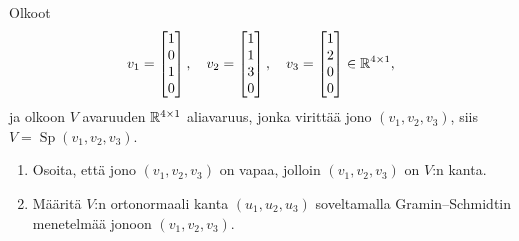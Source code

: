 \documentclass[11pt,a4paper]{amsart}
\begin{document}
\newpage

\begin{exercise}
  Olkoot
  \[
    v_1 =
    \begin{bmatrix}1 \\ 0 \\ 1 \\ 0
    \end{bmatrix},\quad
    v_2 =
    \begin{bmatrix}1 \\ 1 \\ 3 \\ 0
    \end{bmatrix},\quad
    v_3 =
    \begin{bmatrix}1 \\ 2 \\ 0 \\ 0
    \end{bmatrix}
    \in\mathbb{R}^{4\times 1},
  \]
  ja olkoon \(V\) avaruuden \(\mathbb{R}^{4\times 1}\) aliavaruus, jonka
  virittää jono \((v_1,v_2,v_3)\), siis
  \(V=\operatorname{Sp}(v_1,v_2,v_3)\).
  \begin{enumerate}[label=(\alph*), leftmargin=*]
    \item Osoita, että jono \((v_1,v_2,v_3)\) on vapaa, jolloin
      \((v_1,v_2,v_3)\) on \(V\):n kanta.
    \item Määritä \(V\):n ortonormaali kanta \((u_1,u_2,u_3)\)
      soveltamalla Gramin--Schmidtin menetelmää jonoon
      \((v_1,v_2,v_3)\).
  \end{enumerate}
\end{exercise}
\end{document}
